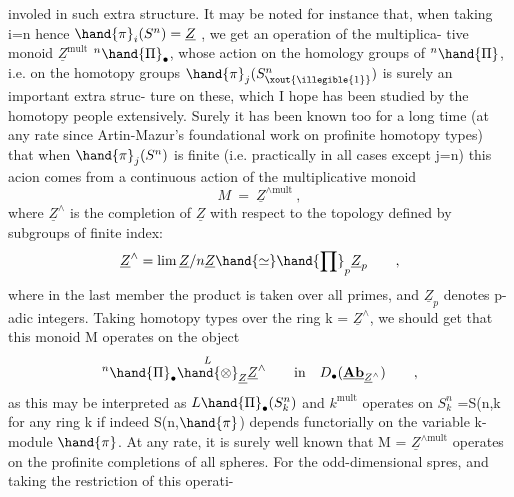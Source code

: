 
involed in such extra structure.  It may be noted for instance that,
when taking i=n  hence $\hand{\pi}_i(S^n)=\underline{Z}$ ,  we get an operation of the multiplica-%
tive monoid  $\underline{Z}^{\mathrm{mult}}$  ${}^n\hand{\Pi}_\bullet$,  whose action on the homology groups of ${}^n\hand{\Pi}$,
i.e. on the homotopy groups  $\hand{\pi}_j(S^n_{\xout{\illegible{1}}})$\hand{,} is surely an important extra struc-%
ture on these,  which I hope has been studied by the homotopy people
extensively.  Surely it has been known too for a long time (at any rate
since Artin-Mazur's foundational work on profinite homotopy types) that
when $\hand{\pi}_j(S^n)$ is finite (i.e. practically in all cases except j=n) this
acion comes from a continuous action of  the multiplicative 
monoid  
\[ M \ = \ \underline{Z}^{\wedge\mathrm{mult}} \ , \]
where  $\underline{Z}^\wedge$ is the completion of $\underline{Z}$ with respect to the topology defined by
subgroups of finite index:
\[ \underline{Z}^\wedge = \lim \underline{Z}/n\underline{Z} \hand{\simeq} \hand{\prod}_p \underline{Z}_p \qquad , \]
where in the last member the product is taken over all primes,  and $\underline{Z}_p$
denotes p-adic integers.  Taking homotopy types over the ring k = $\underline{Z}^\wedge$,
we should get that this monoid  M operates on the object
\[ {}^n\hand{\Pi}_\bullet \overset{L}{\hand{\otimes}}_{\underline{Z}}\underline{Z}^\wedge \qquad \text{in} \quad D_\bullet(\underline{\mathbf{Ab}}_{\underline{Z}^\wedge}) \qquad , \]
as this may be interpreted as  $L\hand{\Pi}_\bullet(S^n_k)$\hand{,} and  $k^{\mathrm{mult}}$  operates on $S^n_k$ =S(n,k\hand{)}
for any ring k \hand{(}if indeed  S(n,$\hand{\pi}$)  depends functorially on the variable
k-module $\hand{\pi}$\hand{)}.  \deleted{(}At any rate,  it is surely well\unsure{\hand{-}} known that 
M = $\underline{Z}^{\wedge\mathrm{mult}}$  operates on the profinite completions of all spheres.  For
the odd-dimensional spres,  and taking the restriction of this operati-%

